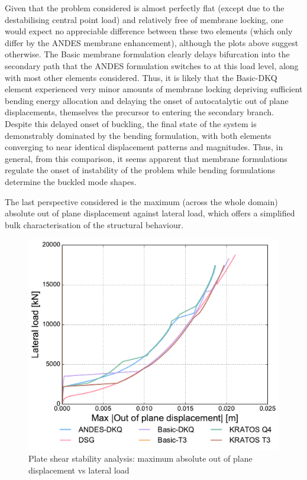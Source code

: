 Given that the problem considered is almost perfectly flat (except due to the destabilising central point load) and relatively free of membrane locking, one would expect no appreciable difference between these two elements (which only differ by the ANDES membrane enhancement), although the plots above suggest otherwise. The Basic membrane formulation clearly delays bifurcation into the secondary path that the ANDES formulation switches to at this load level, along with most other elements considered. Thus, it is likely that the Basic-DKQ element experienced very minor amounts of membrane locking depriving sufficient bending energy allocation and delaying the onset of autocatalytic out of plane displacements, themselves the precursor to entering the secondary branch. Despite this delayed onset of buckling, the final state of the system is demonstrably dominated by the bending formulation, with both elements converging to near identical displacement patterns and magnitudes. Thus, in general, from this comparison, it seems apparent that membrane formulations regulate the onset of instability of the problem while bending formulations determine the buckled mode shapes.

The last perspective considered is the maximum (across the whole domain) absolute out of plane displacement against lateral load, which offers a simplified bulk characterisation of the structural behaviour.

\begin{figure}[H]
	\centering
	\def\svgwidth{\columnwidth}
	\includegraphics[width=12cm]{images/stability_wrinkle_abstrans_disp.pdf}
	\caption{Plate shear stability analysis: maximum absolute out of plane displacement vs lateral load}
	\label{pic:wrinkle3}
\end{figure}

